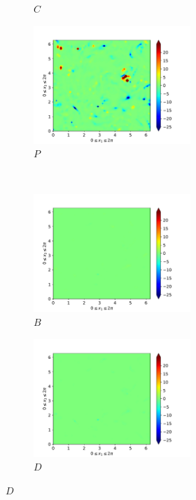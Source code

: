 \begin{figure}[H]
\begin{subfigure}{0.45\textwidth}
        \caption{$C$}
    \end{subfigure}
    \newline
    \begin{subfigure}{0.45\textwidth}
        \includegraphics[height=1.75in]{media/run-cds-65/P-ke-1380}
        \caption{$P$}
    \end{subfigure}
    ~
    \begin{subfigure}{0.45\textwidth}
        \includegraphics[height=1.75in]{media/run-cds-65/B-ke-1380}
        \caption{$B$}
    \end{subfigure}
    \newline
    \begin{subfigure}{0.45\textwidth}
        \includegraphics[height=1.75in]{media/run-cds-65/D-ke-1380}
        \caption{$D$}
    \end{subfigure}
\end{figure}
